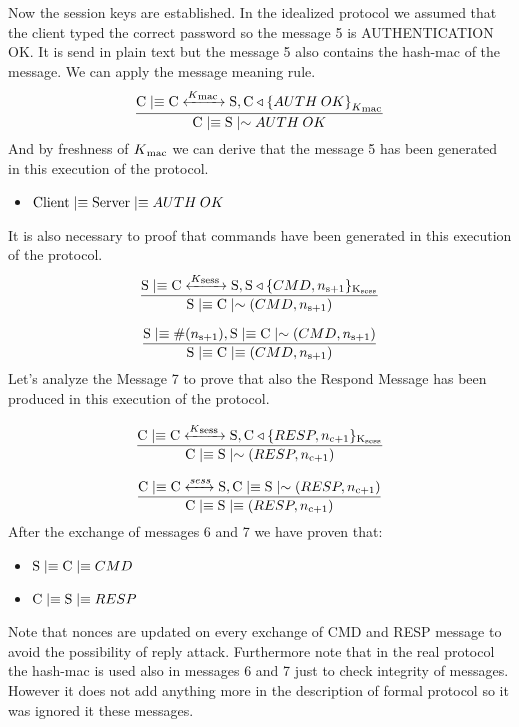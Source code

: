 Now the session keys are established. In the idealized protocol we assumed that the client typed the correct password so the message 5 is AUTHENTICATION OK. It is send in plain text but the message 5 also contains the hash-mac of the message. We can apply the message meaning rule.
\[
	\frac{\textnormal{C} \mid\equiv \textnormal{C} \xleftrightarrow{K\textsubscript{mac }} \textnormal{S}, \textnormal{C} \triangleleft { \{ AUTH\:OK \} }_{K\textsubscript{mac}}}
	{\textnormal{C} \mid\equiv \textnormal{S} \mid\sim {AUTH\:OK}} 
\]
And by freshness of \(K\textsubscript{mac}\) we can derive that the message 5 has been generated in this execution of the protocol. 
\begin{itemize}
	\item $\textnormal{Client} \mid\equiv \textnormal{Server}\mid\equiv AUTH\:OK$
\end{itemize}
It is also necessary to proof that commands have been generated in this execution of the protocol.
\[ \frac{\textnormal{S} \mid\equiv \textnormal{C} \xleftrightarrow{K\textsubscript{sess }} \textnormal{S}, \textnormal{S} \triangleleft \lbrace CMD, n\textsubscript{s+1} \rbrace \textsubscript{K\textsubscript{sess}} }{ \textnormal{S} \mid\equiv \textnormal{C} \mid\sim (CMD,n\textsubscript{s+1}) }\]

\[ \frac{ \textnormal{S} \mid\equiv \#(n\textsubscript{s+1}), \textnormal{S} \mid\equiv \textnormal{C} \mid\sim (CMD,n\textsubscript{s+1}) } 
        {\textnormal{S} \mid\equiv \textnormal{C} \mid\equiv (CMD,n\textsubscript{s+1})}\]
Let's analyze the Message 7 to prove that also the Respond Message has been produced in this execution of the protocol.

\[ \frac{\textnormal{C} \mid\equiv \textnormal{C} \xleftrightarrow{K\textsubscript{sess }} \textnormal{S}, \textnormal{C} \triangleleft \lbrace RESP, n\textsubscript{c+1} \rbrace \textsubscript{K\textsubscript{sess}}}{ \textnormal{C} \mid\equiv \textnormal{S} \mid\sim (RESP,n\textsubscript{c+1})} 
\]

\[ \frac{\textnormal{C} \mid\equiv \textnormal{C} \xleftrightarrow{sess } \textnormal{S}, \textnormal{C} \mid\equiv \textnormal{S} \mid\sim (RESP,n\textsubscript{c+1}) }{\textnormal{C} \mid\equiv \textnormal{S} \mid\equiv (RESP,n\textsubscript{c+1})}
\]
After the exchange of messages 6 and 7 we have proven that:
\begin{itemize}
	\item \( \textnormal{S} \mid\equiv \textnormal{C} \mid\equiv CMD\)
	\item \( \textnormal{C} \mid\equiv \textnormal{S} \mid\equiv RESP\)
\end{itemize}
Note that nonces are updated on every exchange of CMD and RESP message to avoid the possibility of reply attack. Furthermore note that in the real protocol the hash-mac is used also in messages 6 and 7 just to check integrity of messages. However it does not add anything more in the description of formal protocol so it was ignored it these messages.
